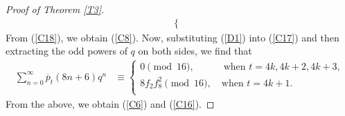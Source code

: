 \documentclass[12pt,reqno,a4paper]{amsart}
\numberwithin{equation}{section}
\begin{document}
\begin{proof}[Proof of Theorem \ref{T3}]
\begin{align}
\begin{cases}
   \end{cases}
\end{align}
From (\ref{C18}), we obtain (\ref{C8}). Now, substituting (\ref{D1}) into (\ref{C17}) and then extracting the odd powers of $q$ on both sides, we find that
\begin{align*}
     \sum_{n=0}^\infty \overline{p}_{t}(8n+6)q^n& \equiv \begin{cases}
          0\pmod{16},\qquad\quad \text{when $t=4k,4k+2,4k+3$},\\
          8f_2f_8^2\pmod{16},\quad \text{when $t=4k+1$}.\\
      \end{cases} 
    \end{align*}
From the above, we obtain (\ref{C6}) and (\ref{C16}).
\end{proof}


  
     
\end{document}
